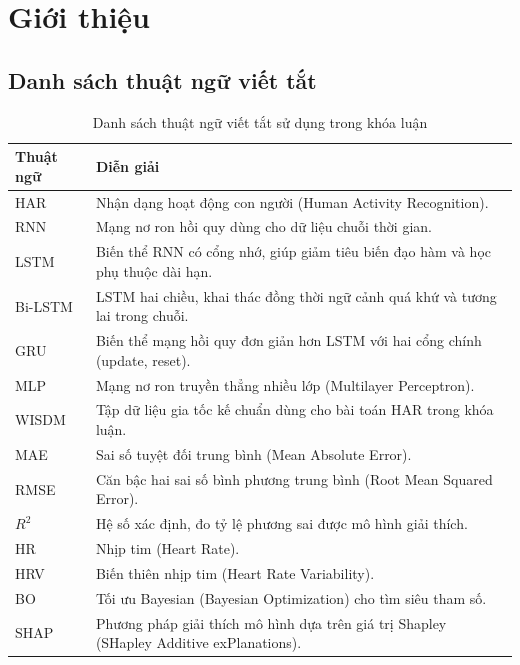 
\chapter{Giới thiệu}
\label{chap:introduction}

\section*{Danh sách thuật ngữ viết tắt}

\begin{table}[htbp]
    \centering
    \caption{Danh sách thuật ngữ viết tắt sử dụng trong khóa luận}
    \label{tab:abbreviations}
    \small
    \begin{tabular}{|p{}|p{}|}
    \hline
        \textbf{Thuật ngữ} & \textbf{Diễn giải} \\ \hline
        HAR & Nhận dạng hoạt động con người (Human Activity Recognition). \\ \hline
        RNN & Mạng nơ ron hồi quy dùng cho dữ liệu chuỗi thời gian. \\ \hline
        LSTM & Biến thể RNN có cổng nhớ, giúp giảm tiêu biến đạo hàm và học phụ thuộc dài hạn. \\ \hline
        Bi-LSTM & LSTM hai chiều, khai thác đồng thời ngữ cảnh quá khứ và tương lai trong chuỗi. \\ \hline
        GRU & Biến thể mạng hồi quy đơn giản hơn LSTM với hai cổng chính (update, reset). \\ \hline
        MLP & Mạng nơ ron truyền thẳng nhiều lớp (Multilayer Perceptron). \\ \hline
        WISDM & Tập dữ liệu gia tốc kế chuẩn dùng cho bài toán HAR trong khóa luận. \\ \hline
        MAE & Sai số tuyệt đối trung bình (Mean Absolute Error). \\ \hline
        RMSE & Căn bậc hai sai số bình phương trung bình (Root Mean Squared Error). \\ \hline
        $R^2$ & Hệ số xác định, đo tỷ lệ phương sai được mô hình giải thích. \\ \hline
        HR & Nhịp tim (Heart Rate). \\ \hline
        HRV & Biến thiên nhịp tim (Heart Rate Variability). \\ \hline
        BO & Tối ưu Bayesian (Bayesian Optimization) cho tìm siêu tham số. \\ \hline
        SHAP & Phương pháp giải thích mô hình dựa trên giá trị Shapley (SHapley Additive exPlanations). \\ \hline
    \end{tabular}
\end{table}


